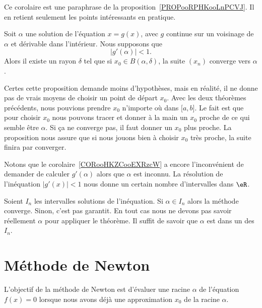 Ce corolaire est une paraphrase de la proposition~\ref{PROPooRPHKooLnPCVJ}. Il en retient seulement les points intéressants en pratique.

\begin{corollary}     \label{CORooHKZCooEXRzcW}
	Soit \( \alpha\) une solution de l'équation \( x=g(x)\), avec \( g\) continue sur un voisinage de \( \alpha\) et dérivable dans l'intérieur. Nous supposons que
	\begin{equation}
		| g'(\alpha) |<1.
	\end{equation}
	Alors il existe un rayon \( \delta\) tel que si \( x_0\in B(\alpha,\delta)\), la suite \( (x_n)\) converge vers \( \alpha\).
\end{corollary}

Certes cette proposition demande moins d'hypothèses, mais en réalité, il ne donne pas de vrais moyens de choisir un point de départ \( x_0\). Avec les deux théorèmes précédents, nous pouvions prendre \( x_0\) n'importe où dans \( \mathopen[ a , b \mathclose]\). Le fait est que pour choisir \( x_0\) nous pouvons tracer et donner à la main un \( x_0\) proche de ce qui semble être \( \alpha\). Si ça ne converge pas, il faut donner un \(x_0\) plus proche. La proposition nous assure que si nous jouons bien à choisir \( x_0\) très proche, la suite finira par converger.

Notons que le corolaire~\ref{CORooHKZCooEXRzcW} a encore l'inconvénient de demander de calculer \( g'(\alpha)\) alors que \( \alpha\) est inconnu. La résolution de l'inéquation \( | g'(x) |<1\) nous donne un certain nombre d'intervalles dans \( \eR\).

Soient \( I_n\) les intervalles solutions de l'inéquation.  Si \( \alpha\in I_n\) alors la méthode converge. Sinon, c'est pas garantit. En tout cas nous ne devons pas savoir réellement \( \alpha\) pour appliquer le théorème. Il suffit de savoir que \( \alpha\) est dans un des \( I_n\).

\section{Méthode de Newton}
\label{SECooIKXNooACLljs}

L'objectif de la méthode de Newton est d'évaluer une racine \( \alpha\) de l'équation \( f(x)=0\) lorsque nous avons déjà une approximation \( x_0\) de la racine \( \alpha\).

